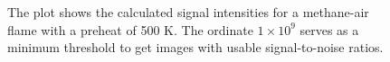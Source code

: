 \begin{figure}

\centering



\caption[Methane-air flame results - III]{The plot shows the calculated signal intensities for a methane-air flame with a preheat of 500 K. The ordinate \(1\times10^9\) serves as a minimum threshold to get images with usable signal-to-noise ratios.}

\label{fig:01-500}

\end{figure}
